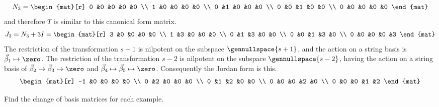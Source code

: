 \begin{exercises}
\begin{answer}
\begin{exparts}
\begin{equation*}
            N_3=
            \begin{mat}[r]
               0  &0  &0  &0  &0  \\
               1  &0  &0  &0  &0  \\
               0  &1  &0  &0  &0  \\
               0  &0  &1  &0  &0  \\
               0  &0  &0  &0  &0
             \end{mat}
          \end{equation*}
          and therefore $T$ is similar to this canonical form matrix.
          \begin{equation*}
           J_3=N_3+3I=
           \begin{mat}[r]
               3  &0  &0  &0  &0  \\
               1  &3  &0  &0  &0  \\
               0  &1  &3  &0  &0  \\
               0  &0  &1  &3  &0  \\
               0  &0  &0  &0  &3
             \end{mat}
         \end{equation*} 
         \partsitem The restriction of the transformation $s+1$ is nilpotent
          on the subspace $\gennullspace{s+1}$, and the action on a 
          string basis is  $\vec{\beta}_1\mapsto\zero$.  
          The restriction of the transformation $s-2$ is nilpotent
          on the subspace $\gennullspace{s-2}$, having the action on a 
          string basis of $\vec{\beta}_2\mapsto\vec{\beta}_3\mapsto\zero$
          and $\vec{\beta}_4\mapsto\vec{\beta}_5\mapsto\zero$.        
          Consequently the Jordan form is this.
          \begin{equation*}
            \begin{mat}[r]
              -1  &0  &0  &0  &0  \\
               0  &2  &0  &0  &0  \\
               0  &1  &2  &0  &0  \\
               0  &0  &0  &2  &0  \\
               0  &0  &0  &1  &2
             \end{mat} 
          \end{equation*}
      \end{exparts}  
    \end{answer}
  \item 
    Find the change of basis matrices for each example. 

\end{exercises}

